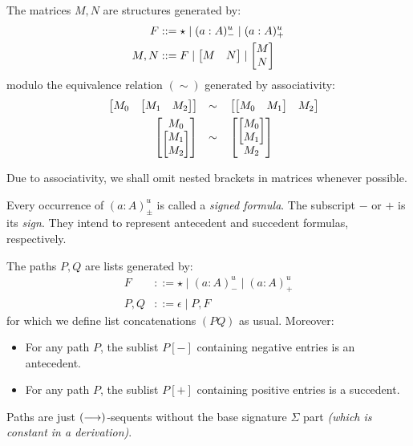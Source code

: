 \documentclass[twoside]{report}
\begin{document}
\begin{definition}[Matrices]
\label{def:matrices}
The matrices $M, N$ are structures generated by:
$$
\begin{aligned}
F &::= \star \mid (a : A)^u_- \mid (a : A)^u_+ \\
M, N &::= F \mid \begin{bmatrix}M & N\end{bmatrix} \mid \begin{bmatrix}M \\ N\end{bmatrix}
\end{aligned}
$$
modulo the equivalence relation $(\sim)$ generated by associativity:
$$
\begin{aligned}
    && \begin{bmatrix}M_0 & \begin{bmatrix}M_1 & M_2\end{bmatrix}\end{bmatrix} && \sim &&& \begin{bmatrix}\begin{bmatrix}M_0 & M_1\end{bmatrix} & M_2\end{bmatrix} \\
    && \begin{bmatrix}M_0 \\ \begin{bmatrix}M_1 \\ M_2\end{bmatrix}\end{bmatrix} && \sim &&& \begin{bmatrix}\begin{bmatrix}M_0 \\ M_1\end{bmatrix} \\ M_2\end{bmatrix} \\
\end{aligned}
$$
\end{definition}

Due to associativity, we shall omit nested brackets in matrices whenever possible.

Every occurrence of $(a : A)^u_{\pm}$ is called a \emph{signed formula}. The subscript $-$ or $+$ is its \emph{sign}. They intend to represent antecedent and succedent formulas, respectively.

\begin{definition}[Paths]
\label{def:matrix_paths}
The paths $P, Q$ are lists generated by:
$$
\begin{aligned}
F &::= \star \mid (a : A)^u_- \mid (a : A)^u_+ \\
P, Q &::= \epsilon \mid P, F
\end{aligned}
$$
for which we define list concatenations $(PQ)$ as usual. Moreover:
\begin{itemize}[noitemsep]
    \item For any path $P$, the sublist $P[-]$ containing negative entries is an antecedent.
    \item For any path $P$, the sublist $P[+]$ containing positive entries is a succedent.
\end{itemize}
\end{definition}

Paths are just $(\longrightarrow)$-sequents without the base signature $\Sigma$ part \emph{(which is constant in a derivation)}.

\newcommand{\paths}{\operatorname{paths}}
\end{document}
